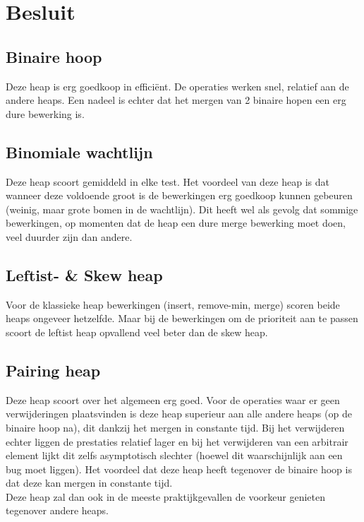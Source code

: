 \documentclass[a4paper,12pt]{report}
\begin{document}
\chapter{Besluit}
\section{Binaire hoop}
Deze heap is erg goedkoop in effici\"ent. De operaties werken snel, relatief aan de andere heaps. Een nadeel is echter dat het mergen van 2 binaire hopen een erg dure bewerking is.
\section{Binomiale wachtlijn}
Deze heap scoort gemiddeld in elke test. Het voordeel van deze heap is dat wanneer deze voldoende groot is de bewerkingen erg goedkoop kunnen gebeuren (weinig, maar grote bomen in de wachtlijn). Dit heeft wel als gevolg dat sommige bewerkingen, op momenten dat de heap een dure merge bewerking moet doen, veel duurder zijn dan andere.
\section{Leftist- \& Skew heap}
Voor de klassieke heap bewerkingen (insert, remove-min, merge) scoren beide heaps ongeveer hetzelfde. Maar bij de bewerkingen om de prioriteit aan te passen scoort de leftist heap opvallend veel beter dan de skew heap.
\section{Pairing heap}
Deze heap scoort over het algemeen erg goed. Voor de operaties waar er geen verwijderingen plaatsvinden is deze heap superieur aan alle andere heaps (op de binaire hoop na), dit dankzij het mergen in constante tijd. Bij het verwijderen echter liggen de prestaties relatief lager en bij het verwijderen van een arbitrair element lijkt dit zelfs asymptotisch slechter (hoewel dit waarschijnlijk aan een bug moet liggen). Het voordeel dat deze heap heeft tegenover de binaire hoop is dat deze kan mergen in constante tijd. \\
Deze heap zal dan ook in de meeste praktijkgevallen de voorkeur genieten tegenover andere heaps.
\end{document}
